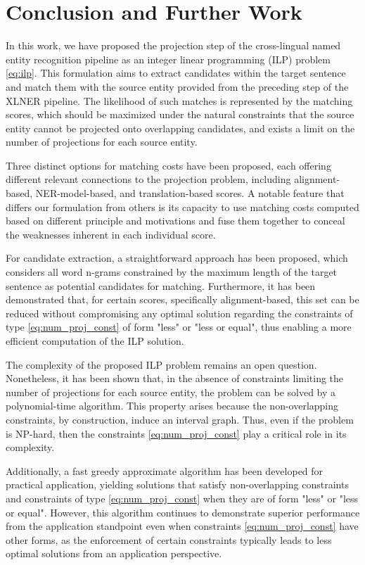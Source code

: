 \chapter{Conclusion and Further Work}
\label{sec:conclusion}

In this work, we have proposed the projection step of the cross-lingual named entity recognition
pipeline as an integer linear programming (ILP) problem \eqref{eq:ilp}.
This formulation aims to extract candidates within the target sentence and match them
with the source entity provided from the preceding step of the XLNER pipeline. The likelihood
of such matches is represented by the matching scores, which should be maximized under
the natural constraints that the source entity cannot be projected onto overlapping candidates,
and exists a limit on the number of projections for each source entity.

Three distinct options for matching costs have been proposed, each offering different relevant
connections to the projection problem, including alignment-based, NER-model-based, and translation-based scores.
A notable feature that differs our formulation from others is its capacity to use matching costs
computed based on different principle and motivations and fuse them together to conceal the weaknesses
inherent in each individual score.

For candidate extraction, a straightforward approach has been proposed, which considers all word
n-grams constrained by the maximum length of the target sentence as potential candidates for matching.
Furthermore, it has been demonstrated that, for certain scores, specifically alignment-based, this
set can be reduced without compromising any optimal solution regarding the constraints of type
\eqref{eq:num_proj_const} of form "less" or "less or equal", thus enabling a more efficient computation
of the ILP solution.

The complexity of the proposed ILP problem remains an open question. Nonetheless, it has been
shown that, in the absence of constraints limiting the number of projections for each source
entity, the problem can be solved by a polynomial-time algorithm. This property arises because the
non-overlapping constraints, by construction, induce an interval graph. Thus, even if the problem is NP-hard,
then the constraints \eqref{eq:num_proj_const} play a critical role in its complexity.

Additionally, a fast greedy approximate algorithm has been developed for practical application,
yielding solutions that satisfy non-overlapping constraints and constraints of
type \eqref{eq:num_proj_const} when they are of form "less" or "less or equal". However, this algorithm continues
to demonstrate superior performance from the application standpoint even when constraints \eqref{eq:num_proj_const} have other forms, as the
enforcement of certain constraints typically leads to less optimal solutions from an application
perspective.

